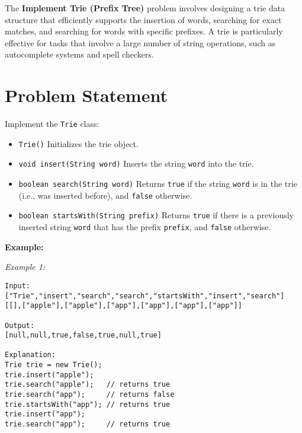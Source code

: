 
\label{problem:implement_trie_prefix_tree}

The \textbf{Implement Trie (Prefix Tree)} problem involves designing a trie data structure that efficiently supports the insertion of words, searching for exact matches, and searching for words with specific prefixes. A trie is particularly effective for tasks that involve a large number of string operations, such as autocomplete systems and spell checkers.

\section*{Problem Statement}

Implement the \texttt{Trie} class:

\begin{itemize}
    \item \texttt{Trie()} Initializes the trie object.
    \item \texttt{void insert(String word)} Inserts the string \texttt{word} into the trie.
    \item \texttt{boolean search(String word)} Returns \texttt{true} if the string \texttt{word} is in the trie (i.e., was inserted before), and \texttt{false} otherwise.
    \item \texttt{boolean startsWith(String prefix)} Returns \texttt{true} if there is a previously inserted string \texttt{word} that has the prefix \texttt{prefix}, and \texttt{false} otherwise.
\end{itemize}

\textbf{Example:}

\textit{Example 1:}

\begin{verbatim}
Input:
["Trie","insert","search","search","startsWith","insert","search"]
[[],["apple"],["apple"],["app"],["app"],["app"],["app"]]

Output:
[null,null,true,false,true,null,true]

Explanation:
Trie trie = new Trie();
trie.insert("apple");
trie.search("apple");   // returns true
trie.search("app");     // returns false
trie.startsWith("app"); // returns true
trie.insert("app");   
trie.search("app");     // returns true
\end{verbatim}


